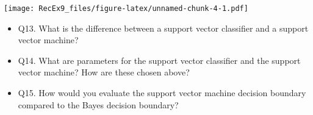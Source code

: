 \documentclass[]{article}
\providecommand{\tightlist}{%
  \setlength{\itemsep}{0pt}\setlength{\parskip}{0pt}}
\begin{document}
\texttt{[image: RecEx9\_files/figure-latex/unnamed-chunk-4-1.pdf]}

\begin{itemize}
\tightlist
\item
  Q13. What is the difference between a support vector classifier and a
  support vector machine?
\item
  Q14. What are parameters for the support vector classifier and the
  support vector machine? How are these chosen above?
\item
  Q15. How would you evaluate the support vector machine decision
  boundary compared to the Bayes decision boundary?
\end{itemize}
\end{document}
